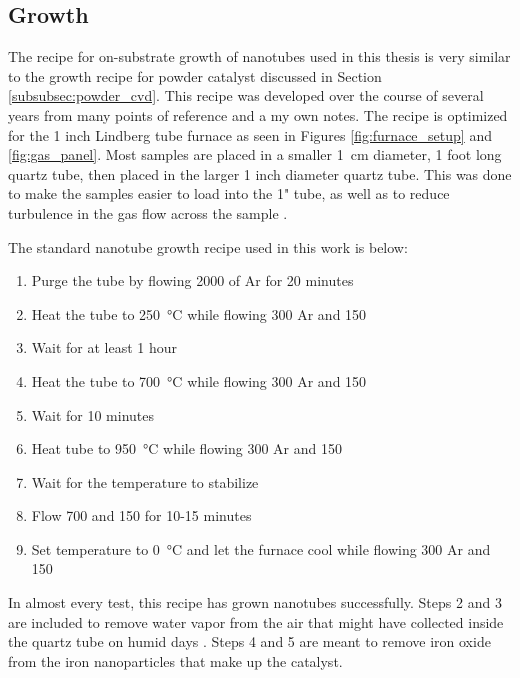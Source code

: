 \subsection{Growth}
\label{subsubsec:substrate_cvd}

The recipe for on-substrate growth of nanotubes used in this thesis is very similar to the growth recipe for powder catalyst discussed in Section \ref{subsubsec:powder_cvd}. This recipe was developed over the course of several years from many points of reference \cite{Kong1998, Kong1998a, Dirks2010, Huang2003, Huang2004, Zhang2013, Hong2005} and a my own notes. The recipe is optimized for the 1 inch Lindberg tube furnace as seen in Figures \ref{fig:furnace_setup} and \ref{fig:gas_panel}. Most samples are placed in a smaller \SI{1}{\centi\meter} diameter, 1 foot long quartz tube, then placed in the larger 1 inch diameter quartz tube. This was done to make the samples easier to load into the 1" tube, as well as to reduce turbulence in the gas flow across the sample \cite{Hong2005}. 

The standard nanotube growth recipe used in this work is below:

\begin{enumerate}
	\item Purge the tube by flowing \SI{2000}{\sccm} of Ar for 20 minutes
	\item Heat the tube to \SI{250}{\degreeCelsius} while flowing \SI{300}{\sccm} Ar and \SI{150}{\sccm} 
	\item Wait for at least 1 hour
	\item Heat the tube to \SI{700}{\degreeCelsius} while flowing \SI{300}{\sccm} Ar and \SI{150}{\sccm} 
	\item Wait for 10 minutes
	\item Heat tube to \SI{950}{\degreeCelsius} while flowing \SI{300}{\sccm} Ar and \SI{150}{\sccm} 
	\item Wait for the temperature to stabilize
	\item Flow \SI{700}{\sccm}  and \SI{150}{\sccm}  for 10-15 minutes
	\item Set temperature to \SI{0}{\degreeCelsius} and let the furnace cool while flowing \SI{300}{\sccm} Ar and \SI{150}{\sccm} 
\end{enumerate}

In almost every test, this recipe has grown nanotubes successfully. Steps 2 and 3 are included to remove water vapor from the air that might have collected inside the quartz tube on humid days \cite{Dirks2010}. Steps 4 and 5 are meant to remove iron oxide from the iron nanoparticles that make up the catalyst. 

